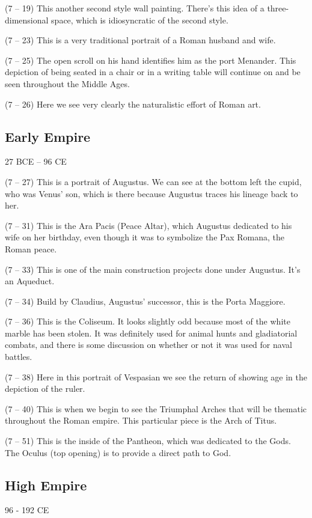 \documentclass{article}
\begin{document}
    \begin{spacing}{1.2}
    \newpage
        (7 -- 19) This another second style wall painting. There's this idea of a three-dimensional space, which is idiosyncratic of the second style.

        (7 -- 23) This is a very traditional portrait of a Roman husband and wife. 

        (7 -- 25) The open scroll on his hand identifies him as the port Menander. This depiction of being seated in a chair or in a writing table will continue on and be seen throughout the Middle Ages.

        (7 -- 26) Here we see very clearly the naturalistic effort of Roman art. 
        
        \subsection{Early Empire}
        \begin{flushright}
            27 BCE -- 96 CE
        \end{flushright}

        (7 -- 27) This is a portrait of Augustus. We can see at the bottom left the cupid, who was Venus' son, which is there because Augustus traces his lineage back to her. 

        (7 -- 31) This is the Ara Pacis (Peace Altar), which Augustus dedicated to his wife on her birthday, even though it was to symbolize the Pax Romana, the Roman peace. 

        (7 -- 33) This is one of the main construction projects done under Augustus. It's an Aqueduct.
        
        (7 -- 34) Build by Claudius, Augustus' successor, this is the Porta Maggiore.

        (7 -- 36) This is the Coliseum. It looks slightly odd because most of the white marble has been stolen. It was definitely used for animal hunts and gladiatorial combats, and there is some discussion on whether or not it was used for naval battles. 
        
        (7 -- 38) Here in this portrait of Vespasian we see the return of showing age in the depiction of the ruler. 

        (7 -- 40) This is when we begin to see the Triumphal Arches that will be thematic throughout the Roman empire. This particular piece is the Arch of Titus.

        (7 -- 51) This is the inside of the Pantheon, which was dedicated to the Gods. The Oculus (top opening) is to provide a direct path to God.
        \subsection{High Empire}
        \begin{flushright}
            96 - 192 CE
        \end{flushright}
        
    \end{spacing}
\end{document}

